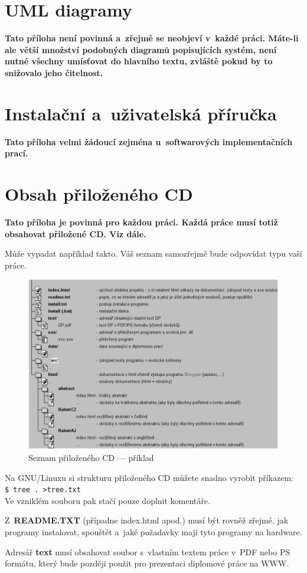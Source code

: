 \documentclass[11pt,twoside,a4paper]{book}
\begin{document}
\chapter{UML diagramy}
\textbf{\large Tato příloha není povinná a~zřejmě se neobjeví v~každé práci. Máte-li ale větší množství podobných
diagramů popisujících systém, není nutné všechny umísťovat do hlavního textu, zvláště pokud by to snižovalo jeho
čitelnost.}

\chapter{Instalační a~uživatelská příručka}
\textbf{\large Tato příloha velmi žádoucí zejména u~softwarových implementačních prací.}

\chapter{Obsah přiloženého CD}
\textbf{\large Tato příloha je povinná pro každou práci. Každá práce musí totiž obsahovat přiložené CD. Viz dále.}

Může vypadat například takto. Váš seznam samozřejmě bude odpovídat typu vaší práce. %

\begin{figure}[h]
\begin{center}
\includegraphics[width=14cm]{figures/seznamcd}
\caption{Seznam přiloženého CD --- příklad}
\label{fig:seznamcd}
\end{center}
\end{figure}

Na GNU/Linuxu si strukturu přiloženého CD můžete snadno vyrobit příkazem:\\ 
\verb|$ tree . >tree.txt|\\
Ve vzniklém souboru pak stačí pouze doplnit komentáře.

Z~\textbf{README.TXT} (případne index.html apod.)  musí být rovněž zřejmé, jak programy instalovat, spouštět a~jaké
požadavky mají tyto programy na hardware.

Adresář \textbf{text}  musí obsahovat soubor s~vlastním textem práce v~PDF nebo PS formátu, který bude později použit
pro prezentaci diplomové práce na WWW.
\end{document}
